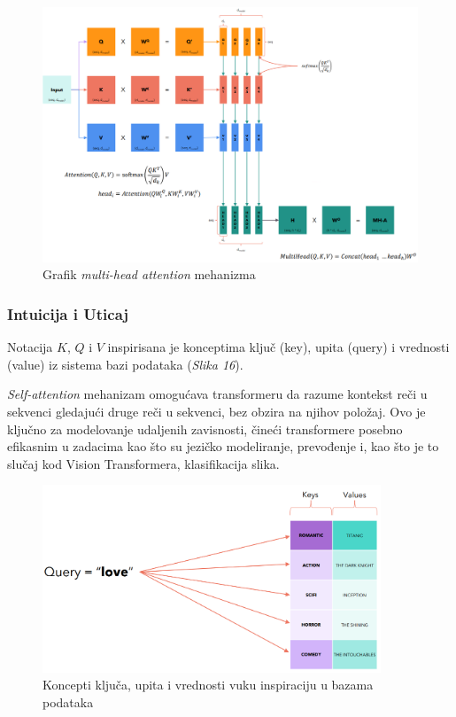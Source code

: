 \documentclass[12pt]{article}
\begin{document}
   \newpage
   \begin{figure}[h!]
      \hspace{-2cm} %
      \vspace{-0.5cm} %
      \includegraphics[width=1.3\textwidth]{mha.png}
      \caption{Grafik \textit{multi-head attention} mehanizma \cite{transformer}}
      \label{fig:mha}
   \end{figure}

   \subsubsection*{Intuicija i Uticaj}

   Notacija $K$, $Q$ i $V$ inspirisana je konceptima ključ (key), upita (query) i 
   vrednosti (value) iz sistema bazi podataka (\textit{Slika 16}).

   \textit{Self-attention} mehanizam omogućava transformeru da razume kontekst reči u sekvenci 
   gledajući druge reči u sekvenci, bez obzira na njihov položaj. 
   Ovo je ključno za modelovanje udaljenih zavisnosti, čineći transformere posebno efikasnim u 
   zadacima kao što su jezičko modeliranje, prevođenje i, kao što je to slučaj kod 
   Vision Transformera, klasifikacija slika.

   \newpage
   \begin{figure}[h!]
      \centering
      \vspace{-1cm} %
      \includegraphics[width=0.9\textwidth]{dict.png}
      \caption{Koncepti ključa, upita i vrednosti vuku inspiraciju u bazama podataka \cite{transformer}}
      \label{fig:trans_inspiration}
   \end{figure}
\end{document}
